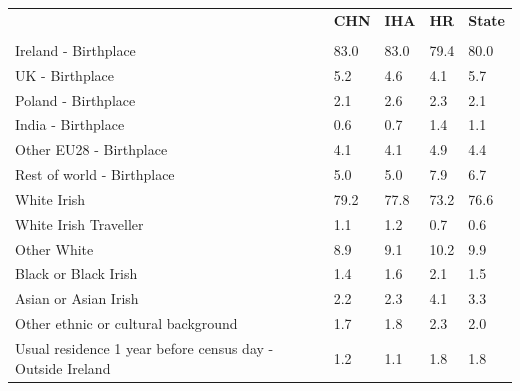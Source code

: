 \documentclass{article}
\begin{document}
\pagebreak
\begin{table}[h]	
\centering
		\begin{tabular}{KTTTT}
  \hline
& \textbf{CHN} & \textbf{IHA} & \textbf{HR}& \textbf{State}\\ 
  \hline
    \\ 
    \hline
Ireland - Birthplace & 83.0& 83.0& 79.4& 80.0\\
UK - Birthplace & 5.2& 4.6& 4.1& 5.7\\
Poland - Birthplace & 2.1& 2.6& 2.3& 2.1\\
India - Birthplace & 0.6& 0.7& 1.4& 1.1\\
Other EU28 - Birthplace & 4.1& 4.1& 4.9& 4.4\\
Rest of world - Birthplace & 5.0& 5.0& 7.9& 6.7\\
    \hline
White Irish & 79.2& 77.8& 73.2& 76.6\\
White Irish Traveller & 1.1& 1.2& 0.7& 0.6\\
Other White &  8.9&  9.1& 10.2&  9.9\\
Black or Black Irish & 1.4& 1.6& 2.1& 1.5\\
Asian or Asian Irish & 2.2& 2.3& 4.1& 3.3\\
Other ethnic or cultural background & 1.7& 1.8& 2.3& 2.0\\
    \hline
Usual residence 1 year before census day - Outside Ireland & 1.2& 1.1& 1.8& 1.8\\


\end{tabular}
\end{table}
\end{document}

